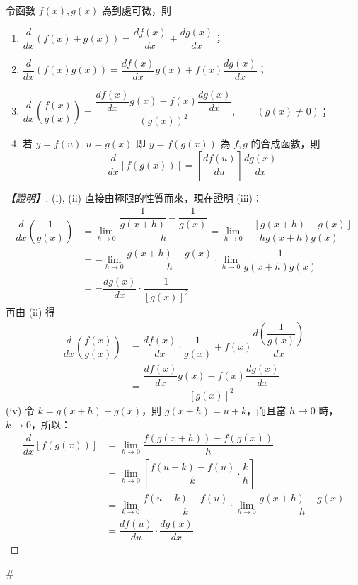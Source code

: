 \begin{theorem}[微分運算的基本法則]\label{thm:b6-app4-diff-rules}
令函數 $f(x), g(x)$ 為到處可微，則
\begin{enumerate}[label=(\roman*), leftmargin=2em]
  \item $\dfrac{d}{dx}(f(x)\pm g(x)) = \dfrac{df(x)}{dx} \pm \dfrac{dg(x)}{dx}$；
  \item $\dfrac{d}{dx}(f(x)g(x)) = \dfrac{df(x)}{dx}g(x) + f(x)\dfrac{dg(x)}{dx}$；
  \item $\dfrac{d}{dx}\left(\dfrac{f(x)}{g(x)}\right) = \dfrac{\dfrac{df(x)}{dx}g(x) - f(x)\dfrac{dg(x)}{dx}}{(g(x))^2}, \qquad (g(x)\ne 0)$；
  \item 若 $y=f(u), u=g(x)$ 即 $y=f(g(x))$ 為 $f, g$ 的合成函數，則
  \[ \dfrac{d}{dx}[f(g(x))] = \left[\dfrac{df(u)}{du}\right]\dfrac{dg(x)}{dx} \]
\end{enumerate}
\end{theorem}

\begin{proof}[【證明】]
(i), (ii) 直接由極限的性質而來，現在證明 (iii)：
\begin{align*}
\dfrac{d}{dx}\left(\dfrac{1}{g(x)}\right) &= \lim_{h\to 0}\dfrac{\dfrac{1}{g(x+h)} - \dfrac{1}{g(x)}}{h} = \lim_{h\to 0}\dfrac{-[g(x+h)-g(x)]}{h g(x+h)g(x)} \\
&= -\lim_{h\to 0}\dfrac{g(x+h)-g(x)}{h}\cdot\lim_{h\to 0}\dfrac{1}{g(x+h)g(x)} \\
&= -\dfrac{dg(x)}{dx}\cdot\dfrac{1}{[g(x)]^2}
\end{align*}
再由 (ii) 得
\begin{align*}
\dfrac{d}{dx}\left(\dfrac{f(x)}{g(x)}\right) &= \dfrac{df(x)}{dx}\cdot\dfrac{1}{g(x)} + f(x)\dfrac{d\left(\dfrac{1}{g(x)}\right)}{dx} \\
&= \dfrac{\dfrac{df(x)}{dx}g(x) - f(x)\dfrac{dg(x)}{dx}}{[g(x)]^2}
\end{align*}
(iv) 令 $k=g(x+h)-g(x)$，則 $g(x+h)=u+k$，而且當 $h\longrightarrow 0$ 時，$k\longrightarrow 0$，所以：
\begin{align*}
\dfrac{d}{dx}[f(g(x))] &= \lim_{h\to 0}\dfrac{f(g(x+h))-f(g(x))}{h} \\
&= \lim_{h\to 0}\left[\dfrac{f(u+k)-f(u)}{k}\cdot\dfrac{k}{h}\right] \\
&= \lim_{k\to 0}\dfrac{f(u+k)-f(u)}{k}\cdot\lim_{h\to 0}\dfrac{g(x+h)-g(x)}{h} \\
&= \dfrac{df(u)}{du}\cdot\dfrac{dg(x)}{dx}
\end{align*}
\end{proof}\hfill$\#$

